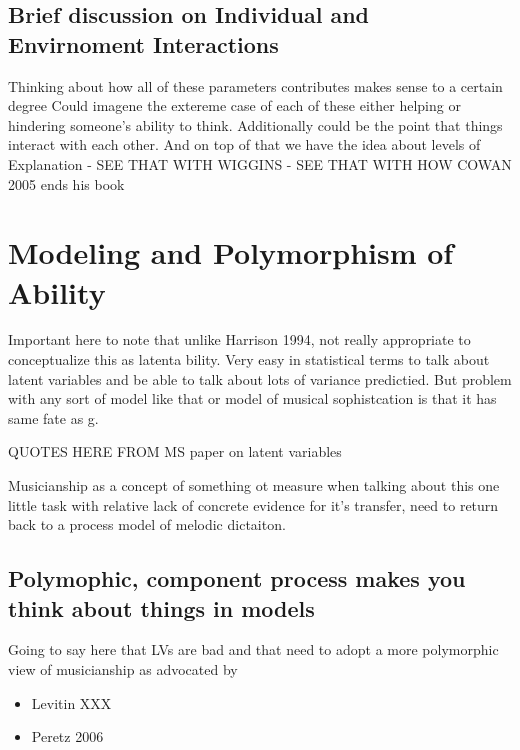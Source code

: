 \documentclass[]{book}
\providecommand{\tightlist}{%
  \setlength{\itemsep}{0pt}\setlength{\parskip}{0pt}}
\theoremstyle{definition}
\theoremstyle{definition}
\theoremstyle{definition}
\theoremstyle{remark}
\begin{document}
\hypertarget{brief-discussion-on-individual-and-envirnoment-interactions}{%
\subsection{Brief discussion on Individual and Envirnoment
Interactions}\label{brief-discussion-on-individual-and-envirnoment-interactions}}

Thinking about how all of these parameters contributes makes sense to a
certain degree Could imagene the extereme case of each of these either
helping or hindering someone's ability to think. Additionally could be
the point that things interact with each other. And on top of that we
have the idea about levels of Explanation - SEE THAT WITH WIGGINS - SEE
THAT WITH HOW COWAN 2005 ends his book

\hypertarget{modeling-and-polymorphism-of-ability}{%
\section{Modeling and Polymorphism of
Ability}\label{modeling-and-polymorphism-of-ability}}

Important here to note that unlike Harrison 1994, not really appropriate
to conceptualize this as latenta bility. Very easy in statistical terms
to talk about latent variables and be able to talk about lots of
variance predictied. But problem with any sort of model like that or
model of musical sophistcation is that it has same fate as g.

QUOTES HERE FROM MS paper on latent variables

Musicianship as a concept of something ot measure when talking about
this one little task with relative lack of concrete evidence for it's
transfer, need to return back to a process model of melodic dictaiton.

\hypertarget{polymophic-component-process-makes-you-think-about-things-in-models}{%
\subsection{Polymophic, component process makes you think about things
in
models}\label{polymophic-component-process-makes-you-think-about-things-in-models}}

Going to say here that LVs are bad and that need to adopt a more
polymorphic view of musicianship as advocated by

\begin{itemize}
\tightlist
\item
  Levitin XXX
\item
  Peretz 2006
\end{itemize}
\end{document}

